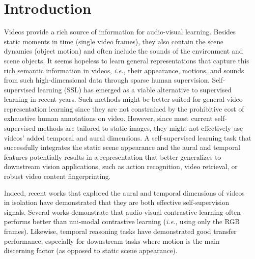 \documentclass[letterpaper]{article} %
\newcommand{\ie}{\emph{i.e.}}
\begin{document}
\section{Introduction}


Videos provide a rich source of information for audio-visual learning.
Besides static moments in time (single video frames), they also contain the scene dynamics (object motion) and often include the sounds of the environment and scene objects.
It seems hopeless to learn general representations that capture this rich semantic information in videos, \ie, their appearance, motions, and sounds from such high-dimensional data through sparse human supervision.
Self-supervised learning (SSL) \cite{Carl2015,chen2020simple,he2020momentum} has emerged as a viable alternative to supervised learning in recent years.
Such methods might be better suited for general video representation learning since they are not constrained by the prohibitive cost of exhaustive human annotations on video.
However, since most current self-supervised methods are tailored to static images, they might not effectively use videos' added temporal and aural dimensions.
A self-supervised learning task that successfully integrates the static scene appearance and the aural and temporal features potentially results in a representation that better generalizes to downstream vision applications, such as action recognition, video retrieval, or robust video content fingerprinting.


Indeed, recent works that explored the aural and temporal dimensions of videos in isolation have demonstrated that they are both effective self-supervision signals.
Several works \cite{Morgado_2021_CVPR,patrick2020multi,alwassel2019self} demonstrate that audio-visual contrastive learning often performs better than uni-modal contrastive learning (\ie, using only the RGB frames).
Likewise, temporal reasoning tasks \cite{misra2016shuffle,jenni2021time,dave2021tclr} have demonstrated good transfer performance, especially for downstream tasks where motion is the main discerning factor (as opposed to static scene appearance).
\end{document}

